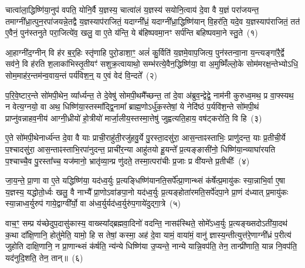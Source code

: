 \setcounter{anuvakam}{0}
चात्वा॑ला॒द्धिष्णि॑या॒नुप॑ वपति॒ योनि॒र्वै य॒ज्ञस्य॒ चात्वा॑लं य॒ज्ञस्य॑ सयोनि॒त्वाय॑ दे॒वा वै य॒ज्ञं परा॑जयन्त॒ तमाग्नी᳚ध्रा॒त्पुन॒रपा॑जयन्ने॒तद्वै य॒ज्ञस्याप॑राजितं॒ यदाग्नी᳚ध्रं॒ यदाग्नी᳚ध्रा॒द्धिष्णि॑यान् वि॒हर॑ति॒ यदे॒व य॒ज्ञस्याप॑राजितं॒ तत॑ ए॒वैनं॒ पुन॑स्तनुते परा॒जित्ये॑व॒ खलु॒ वा ए॒ते य॑न्ति॒ ये ब॑हिष्पवमा॒नꣳ सर्प॑न्ति बहिष्पवमा॒ने स्तु॒ते~(१)\ip

आ॒हाग्नी॑द॒ग्नीन् वि ह॑र ब॒र्॒\mbox{}हिः स्तृ॑णाहि पुरो॒डाशा॒ꣳ॒ अलं॑ कु॒र्विति॑ य॒ज्ञमे॒वाप॒जित्य॒ पुन॑स्तन्वा॒ना य॒न्त्यङ्गा॑रै॒र्द्वे सव॑ने॒ वि ह॑रति श॒लाका॑भिस्तृ॒तीयꣳ॑ सशुक्र॒त्वायाथो॒ सम्भ॑रत्ये॒वैन॒द्धिष्णि॑या॒ वा अ॒मुष्मिँ॑ल्लो॒के सोम॑मरक्ष॒न्तेभ्यो\-ऽधि॒ सोम॒माह॑र॒न्तम॑न्व॒वाय॒न्तं पर्य॑विश॒न्॒ य ए॒वं वेद॑ वि॒न्दते᳚~(२)\ip

प॒रि॒वे॒ष्टार॒न्ते सो॑मपी॒थेन॒ व्या᳚र्ध्यन्त॒ ते दे॒वेषु॑ सोमपी॒थमै᳚च्छन्त॒ तां दे॒वा अ॑ब्रुव॒न्द्वेद्वे॒ नाम॑नी कुरुध्व॒मथ॒ प्र वा॒फ्स्यथ॒ न वेत्य॒ग्नयो॒ वा अथ॒ धिष्णि॑या॒स्तस्मा᳚द्\-द्वि॒नामा᳚ ब्राह्म॒णो\-ऽर्धु॑क॒स्तेषां॒ ये नेदि॑ष्ठं प॒र्यवि॑श॒न्ते सो॑मपी॒थं प्राप्नु॑वन्नाहव॒नीय॑ आग्नी॒ध्रीयो॑ हो॒त्रीयो॑ मार्जा॒लीय॒स्तस्मा॒त्तेषु॑ जुह्वत्यति॒हाय॒ वष॑ट्करोति॒ वि हि~(३)\ip

ए॒ते सो॑मपी॒थेनार्ध्य॑न्त दे॒वा वै याः प्राची॒राहु॑ती॒रजु॑हवु॒र्ये पु॒रस्ता॒दसु॑रा॒ आस॒न्ताꣴस्ताभिः॒ प्राणु॑दन्त॒ याः प्र॒तीची॒र्ये प॒श्चादसु॑रा॒ आस॒न्ताꣴस्ताभि॒रपा॑नुदन्त॒ प्राची॑र॒न्या आहु॑तयो हू॒यन्ते᳚ प्र॒त्यङ्ङासी॑नो॒ धिष्णि॑या॒न्व्याघा॑रयति प॒श्चाच्चै॒व पु॒रस्ता᳚च्च॒ यज॑मानो॒ भ्रातृ॑व्या॒न्प्र णु॑दते॒ तस्मा॒त्परा॑चीः प्र॒जाः प्र वी॑यन्ते प्र॒तीचीः᳚~(४)\ip

जा॒य॒न्ते॒ प्रा॒णा वा ए॒ते यद्धिष्णि॑या॒ यद॑ध्व॒र्युः प्र॒त्यङ्धिष्णि॑यानति॒सर्पे᳚त्प्रा॒णान्थ्सं क॑र्\mbox{}षेत्प्र॒मायु॑कः स्या॒न्नाभि॒र्वा ए॒षा य॒ज्ञस्य॒ यद्धोतो॒र्ध्वः खलु॒ वै नाभ्यै᳚ प्रा॒णो\-ऽवा॑ङपा॒नो यद॑ध्व॒र्युः प्र॒त्यङ्होता॑रमति॒सर्पे॑दपा॒ने प्रा॒णं द॑ध्यात् प्र॒मायु॑कः स्या॒न्नाध्व॒र्युरुप॑ गाये॒द्वाग्वी᳚र्यो॒ वा अ॑ध्व॒र्युर्यद॑ध्व॒र्युरु॑प॒गाये॑दुद्गा॒त्रे~(५)\ip

वाच॒ꣳ॒ सम्प्र य॑च्छेदुप॒दासु॑कास्य॒ वाख्स्या᳚द्ब्रह्मवा॒दिनो॑ वदन्ति॒ नासꣴ॑स्थिते॒ सोमे᳚\-ऽध्व॒र्युः प्र॒त्यङ्ख्सदो\-ऽती॑या॒दथ॑ क॒था दा᳚क्षि॒णानि॒ होतु॑मेति॒ यामो॒ हि स तेषां॒ कस्मा॒ अह॑ दे॒वा यामं॒ वाया॑मं॒ वानु॑ ज्ञास्य॒न्तीत्युत्त॑रे॒णाग्नी᳚ध्रं प॒रीत्य॑ जुहोति दाक्षि॒णानि॒ न प्रा॒णान्थ्सं क॑र्\mbox{}षति॒ न्य॑न्ये धिष्णि॑या उ॒प्यन्ते॒ नान्ये यान्नि॒वप॑ति॒ तेन॒ तान्प्री॑णाति॒ यान्न नि॒वप॑ति॒ यद॑नुदि॒शति॒ तेन॒ तान्॥~(६)\ip

